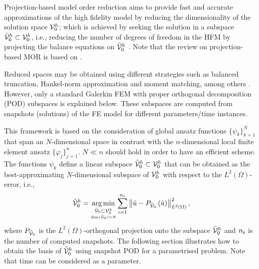 Projection-based model order reduction aims to provide fast and accurate approximations of the high fidelity model by reducing the dimensionality of the solution space ${\cal V}_0^h$; which is achieved by seeking the solution in a subspace ${\tilde{{\cal V}}}_0^h \subset {\cal V}_0^h$, i.e., reducing the number of degrees of freedom in the HFM by projecting the balance equations on ${\tilde{{\cal V}}}_0^h$  \parencite{amsallem2015fast}. Note that the review on projection-based MOR is based on \parencite{mscalameddin}.

Reduced spaces may be obtained using different strategies such as balanced truncation, Hankel-norm approximation and moment matching, among others \parencite{antoulas2005approximation}. However, only a standard Galerkin FEM with proper orthogonal decomposition (POD) subspaces is explained below. These subspaces are computed from snapshots (solutions) of the FE model for different parameters/time instances.

This framework is based on the consideration of global ansatz functions $\{\psi_k\}_{k=1}^N$ that span an $N$-dimensional space in contrast with the $n$-dimensional local finite element ansatz $\{\varphi_j\}_{j=1}^n$. $N\ll n$ should hold in order to have an efficient scheme. The functions $\psi_k$ define a linear subspace ${{\tilde{{\cal V}}}_{0}^h} \subset {\cal V}_{0}^h $ that can be obtained as the best-approximating $N$-dimensional subspace of ${{\cal V}_{0}^h}$ with respect to the $L^2(\Omega)$-error, i.e.,
\begin{equation}
	{\tilde{{\cal V}}}_{0}^h=\underset{\underset{{\rm dim}({\tilde{{\cal V}}}_{0})=N}{{{\tilde{{\cal V}}}_{0} \subset {\cal V}_{0}^h}}}{\arg\min} \displaystyle\sum_{i=1}^{{n_{\rm s}}} \left\lVert { \hat{u} - P_{{\tilde{{\cal V}}}_0} \left( \hat{u} \right) } \right\rVert_{L^2(\Omega)}^{2},
\end{equation}
where $P_{{\tilde{{\cal V}}}_0}$ is the $L^2(\Omega)$-orthogonal projection onto the subspace ${{\tilde{{\cal V}}}_{0}^h}$ and ${n_{\rm s}}$ is the number of computed snapshots. The following section illustrates how to obtain the basis of ${{\tilde{{\cal V}}}_{0}^h}$ using snapshot POD for a parametrised problem. Note that time can be considered as a parameter.

